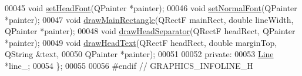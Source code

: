 \begin{DoxyCode}
00045   \textcolor{keywordtype}{void} \hyperlink{class_info_line_a389ea4f5085b60d03022b94e636f11d1}{setHeadFont}(QPainter *painter);
00046   \textcolor{keywordtype}{void} \hyperlink{class_info_line_a4d5084d616c878cb717e8445db0023c1}{setNormalFont}(QPainter *painter);
00047   \textcolor{keywordtype}{void} \hyperlink{class_info_line_a3a0f83ad98fe674513dab679e22cba42}{drawMainRectangle}(QRectF mainRect, \textcolor{keywordtype}{double} lineWidth, QPainter *painter);
00048   \textcolor{keywordtype}{void} \hyperlink{class_info_line_a53e9012a9cef4f07f1d4872c6d250c08}{drawHeadSeparator}(QRectF headRect, QPainter *painter);
00049   \textcolor{keywordtype}{void} \hyperlink{class_info_line_a043932fa92604badc063e09691195609}{drawHeadText}(QRectF headRect, \textcolor{keywordtype}{double} marginTop, QString &text,
00050                     QPainter *painter);
00051                     
00052 private:
00053   \hyperlink{class_line}{Line} *line\_;
00054 \};
00055 
00056 \textcolor{preprocessor}{#endif  // GRAPHICS\_INFOLINE\_H}
\end{DoxyCode}
